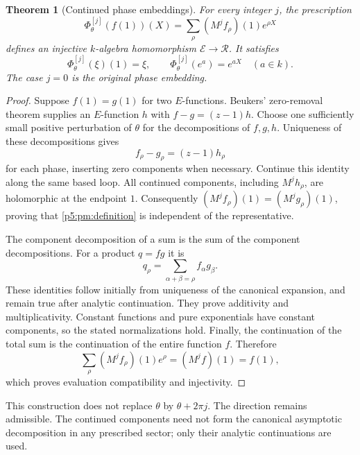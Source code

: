 \documentclass[11pt,a4paper]{article}
\newtheorem{theorem}{Theorem}[section]
\theoremstyle{definition}
\theoremstyle{remark}
\numberwithin{equation}{section}
\begin{document}
\begin{theorem}[Continued phase embeddings]
\label{p5:pm:embedding}
For every integer $j$, the prescription
\begin{equation}\label{p5:pm:definition}
 \Phi_\theta^{[j]}(f(1))(X)
   =\sum_\rho(M^j f_\rho)(1)e^{\rho X}
\end{equation}
defines an injective $k$-algebra homomorphism
$\mathcal E\longrightarrow\mathcal R$.  It satisfies
\[
 \Phi_\theta^{[j]}(\xi)(1)=\xi,
 \qquad \Phi_\theta^{[j]}(e^a)=e^{aX}\quad(a\in k).
\]
The case $j=0$ is the original phase embedding.
\end{theorem}
\begin{proof}
Suppose $f(1)=g(1)$ for two $E$-functions.  Beukers' zero-removal
theorem supplies an $E$-function $h$ with $f-g=(z-1)h$.
Choose one sufficiently small positive perturbation of $\theta$
for the decompositions of $f,g,h$.  Uniqueness of these
decompositions gives
\[
 f_\rho-g_\rho=(z-1)h_\rho
\]
for each phase, inserting zero components when necessary.  Continue
this identity along the same based loop.  All continued components,
including $M^j h_\rho$, are holomorphic at the endpoint $1$.
Consequently $(M^j f_\rho)(1)=(M^j g_\rho)(1)$, proving that
\eqref{p5:pm:definition} is independent of the representative.

The component decomposition of a sum is the sum of the component
decompositions.  For a product $q=fg$ it is
\[
 q_\rho=\sum_{\alpha+\beta=\rho}f_\alpha g_\beta.
\]
These identities follow initially from uniqueness of the canonical
expansion, and remain true after analytic continuation.  They prove
additivity and multiplicativity.  Constant functions and pure
exponentials have constant components, so the stated normalizations
hold.  Finally, the continuation of the total sum is the continuation
of the entire function $f$.  Therefore
\[
 \sum_\rho(M^j f_\rho)(1)e^\rho=(M^j f)(1)=f(1),
\]
which proves evaluation compatibility and injectivity.
\end{proof}

This construction does not replace $\theta$ by $\theta+2\pi j$.
The direction remains admissible.  The continued components need
not form the canonical asymptotic decomposition in any prescribed
sector; only their analytic continuations are used.
\end{document}
